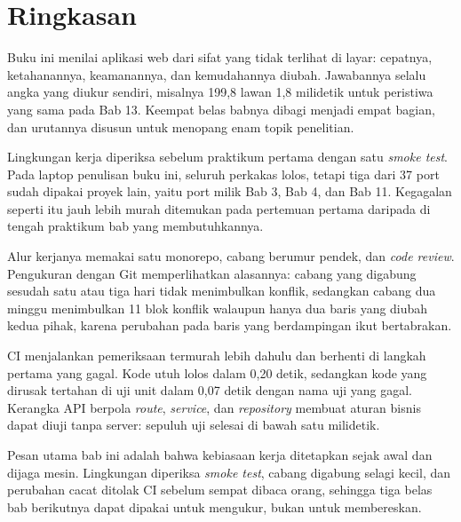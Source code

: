 \section{Ringkasan}

Buku ini menilai aplikasi web dari sifat yang tidak terlihat di layar:
cepatnya, ketahanannya, keamanannya, dan kemudahannya diubah. Jawabannya
selalu angka yang diukur sendiri, misalnya 199,8 lawan 1,8 milidetik untuk
peristiwa yang sama pada Bab 13. Keempat belas babnya dibagi menjadi empat
bagian, dan urutannya disusun untuk menopang enam topik penelitian.

Lingkungan kerja diperiksa sebelum praktikum pertama dengan satu
\textit{smoke test}. Pada laptop penulisan buku ini, seluruh perkakas lolos,
tetapi tiga dari 37 port sudah dipakai proyek lain, yaitu port milik Bab 3,
Bab 4, dan Bab 11. Kegagalan seperti itu jauh lebih murah ditemukan pada
pertemuan pertama daripada di tengah praktikum bab yang membutuhkannya.

Alur kerjanya memakai satu monorepo, cabang berumur pendek, dan
\textit{code review}. Pengukuran dengan Git memperlihatkan alasannya: cabang
yang digabung sesudah satu atau tiga hari tidak menimbulkan konflik,
sedangkan cabang dua minggu menimbulkan 11 blok konflik walaupun hanya dua
baris yang diubah kedua pihak, karena perubahan pada baris yang berdampingan
ikut bertabrakan.

CI menjalankan pemeriksaan termurah lebih dahulu dan berhenti di langkah
pertama yang gagal. Kode utuh lolos dalam 0,20 detik, sedangkan kode yang
dirusak tertahan di uji unit dalam 0,07 detik dengan nama uji yang gagal.
Kerangka API berpola \textit{route}, \textit{service}, dan \textit{repository}
membuat aturan bisnis dapat diuji tanpa server: sepuluh uji selesai di bawah
satu milidetik.

Pesan utama bab ini adalah bahwa kebiasaan kerja ditetapkan sejak awal dan
dijaga mesin. Lingkungan diperiksa \textit{smoke test}, cabang digabung
selagi kecil, dan perubahan cacat ditolak CI sebelum sempat dibaca orang,
sehingga tiga belas bab berikutnya dapat dipakai untuk mengukur, bukan untuk
membereskan.
